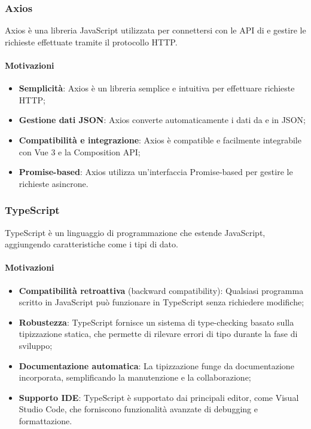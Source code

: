 \subsubsection{Axios}\label{sec:axios}
\par Axios è una libreria JavaScript utilizzata per connettersi con le API di  e gestire le richieste effettuate tramite il protocollo HTTP.
\paragraph*{Motivazioni}
\begin{itemize}
  \item \textbf{Semplicità}: Axios è un libreria semplice e intuitiva per effettuare richieste HTTP;
  \item \textbf{Gestione dati JSON}: Axios converte automaticamente i dati da e in JSON;
  \item \textbf{Compatibilità e integrazione}: Axios è compatible e facilmente integrabile con Vue 3 e la Composition API;
  \item \textbf{Promise-based}: Axios utilizza un'interfaccia Promise-based per gestire le richieste asincrone.
\end{itemize}

\subsubsection{TypeScript}\label{sec:typescript}
\par TypeScript è un linguaggio di programmazione che estende JavaScript, aggiungendo caratteristiche come i tipi di dato.
\paragraph*{Motivazioni}
\begin{itemize}
  \item \textbf{Compatibilità retroattiva} (backward compatibility): Qualsiasi programma scritto in JavaScript può funzionare in TypeScript senza richiedere modifiche;
  \item \textbf{Robustezza}: TypeScript fornisce un sistema di type-checking basato sulla tipizzazione statica, che permette di rilevare errori di tipo durante la fase di sviluppo;
  \item \textbf{Documentazione automatica}: La tipizzazione funge da documentazione incorporata, semplificando la manutenzione e la collaborazione;
  \item \textbf{Supporto IDE}: TypeScript è supportato dai principali editor, come Visual Studio Code, che forniscono funzionalità avanzate di debugging e formattazione.
\end{itemize}

